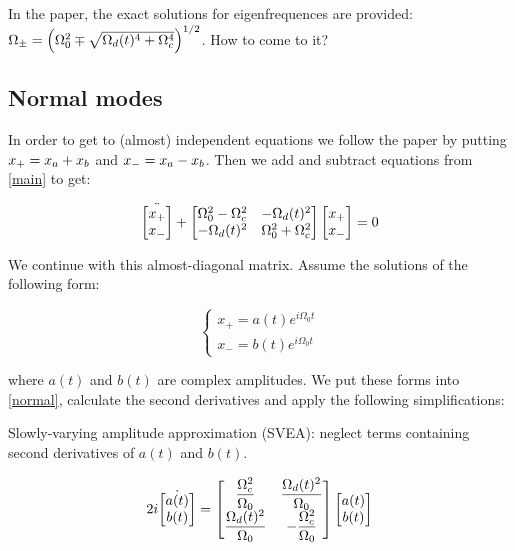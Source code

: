 \begin{QUESTION}
In the paper, the exact solutions for eigenfrequences are provided: \(\Omega_{\pm} = \left(\Omega_0^2
\mp \sqrt{\Omega_d(t)^4 + \Omega_c^4}\right)^{1/2}\). How to come to it?
\end{QUESTION}

\subsection{Normal modes}

In order to get to (almost) independent equations we follow the paper by putting $x_+ = x_a + x_b$
and $x_- = x_a - x_b$.  Then we add and subtract equations from \ref{main} to get:


\begin{equation}
\ddot{\begin{bmatrix}
  x_+ \\
  x_-
\end{bmatrix}}
+
\begin{bmatrix}
  \Omega_0^2 - \Omega_c^2 & -\Omega_d(t)^2 \\
  -\Omega_d(t)^2 & \Omega_0^2 + \Omega_c^2
\end{bmatrix}
\begin{bmatrix}
  x_+ \\
  x_-
\end{bmatrix}
= 0
\label{normal}
\end{equation}


We continue with this almost-diagonal matrix. Assume the solutions of the following form:

\begin{equation}
  \begin{cases}
    x_+ = a(t)e^{i\Omega_0 t} \\
    x_- = b(t)e^{i\Omega_0 t}
  \end{cases}
  \label{sol}
\end{equation}

where $a(t)$ and $b(t)$ are complex amplitudes. We put these forms into \ref{normal}, calculate the
second derivatives and apply the following simplifications:

\ls Slowly-varying amplitude approximation (SVEA): neglect terms containing second derivatives of
$a(t)$ and $b(t)$.
\le


\[
2i
\dot{\begin{bmatrix}
  a(t) \\
  b(t)
\end{bmatrix}}
=
\begin{bmatrix}
  \displaystyle \frac{\Omega_c^2}{\Omega_0} & \displaystyle \frac{\Omega_d(t)^2}{\Omega_0} \\
  \displaystyle \frac{\Omega_d(t)^2}{\Omega_0} & \displaystyle -\frac{\Omega_c^2}{\Omega_0}
\end{bmatrix}
\begin{bmatrix}
  a(t) \\
  b(t)
\end{bmatrix}
\]


